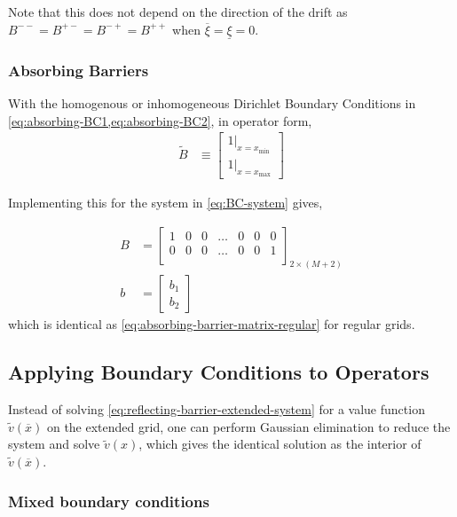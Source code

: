 \documentclass[11pt]{article}
\theoremstyle{definition}
\begin{document}
Note that this does not depend on the direction of the drift as $B^{--} = B^{+-} = B^{-+} = B^{++}$ when $\overline{\xi} = \underline{\xi} = 0$.

\subsubsection{Absorbing Barriers}

With the homogenous or inhomogeneous Dirichlet Boundary Conditions in \cref{eq:absorbing-BC1,eq:absorbing-BC2}, in operator form,
\begin{align}
\tilde{B} &\equiv \begin{bmatrix}
1 \vert_{x = x_{\min}}\\
1 \vert_{x = x_{\max}}
\end{bmatrix}
\end{align}

Implementing this for the system in \cref{eq:BC-system} gives,

\begin{align}
B &= \begin{bmatrix}
1 & 0 & 0 & \dots & 0 & 0 & 0 \\
0 & 0 & 0 & \dots & 0 & 0 & 1\\
\end{bmatrix}_{2 \times (M+2)}\\
b &= \begin{bmatrix}
b_1 \\
b_2
\end{bmatrix}
\end{align}
which is identical as \eqref{eq:absorbing-barrier-matrix-regular} for regular grids.

\subsection{Applying Boundary Conditions to Operators}\label{subsec:applying-bc}
Instead of solving \eqref{eq:reflecting-barrier-extended-system} for a value function $\tilde{v}(\overline{x})$ on the extended grid, one can perform Gaussian elimination to reduce the system and solve $\tilde{v}(x)$, which gives the identical solution as the interior of $\tilde{v}(\overline{x})$.



\subsubsection{Mixed boundary conditions}\label{subsubsec-irregular-grids-mixed-boundary-conditions}
\end{document}
